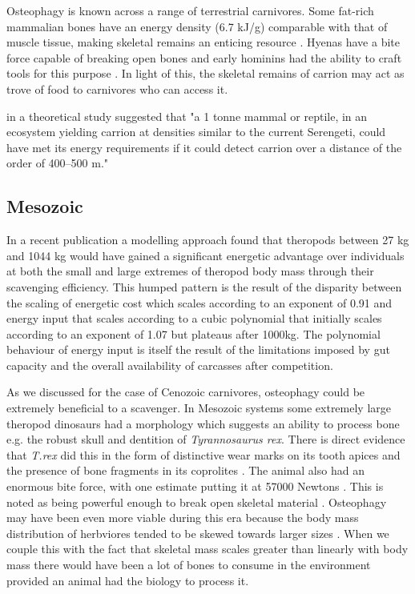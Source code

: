 \documentclass[a4paper,12pt]{article}
\begin{document}
Osteophagy is known across a range of terrestrial carnivores.
Some fat-rich mammalian bones have an energy density (6.7 kJ/g) comparable with that of muscle tissue, making skeletal remains an enticing resource \citep{brown1989study}. 
Hyenas have a bite force capable of breaking open bones and early hominins had the ability to craft tools for this purpose \citep{hone2010feeding,ARCM:ARCM12084}. 
In light of this, the skeletal remains of carrion may act as trove of food to carnivores who can access it.  

\cite{ruxton2004obligate} in a theoretical study suggested that "a 1 tonne mammal or reptile, in an ecosystem yielding carrion at densities similar to the current Serengeti, could have met its energy requirements if it could detect carrion over a distance of the order of 400–500 m."

\subsection*{Mesozoic}
In a recent publication a modelling approach found that theropods between 27 kg and 1044 kg would have gained a significant energetic advantage over individuals at both the small and large extremes of theropod body mass through their scavenging efficiency. 
This humped pattern is the result of the disparity between the scaling of energetic cost which scales according to an exponent of 0.91 and energy input that scales according to a cubic polynomial that initially scales according to an exponent of 1.07 but plateaus after 1000kg. 
The polynomial behaviour of energy input is itself the result of the limitations imposed by gut capacity and the overall availability of carcasses after competition.

As we discussed for the case of Cenozoic carnivores, osteophagy could be extremely beneficial to a scavenger. 
In Mesozoic systems some extremely large theropod dinosaurs had a morphology which suggests an ability to process bone e.g. the robust skull and dentition of \textit{Tyrannosaurus rex}. 
There is direct evidence that \textit{T.rex} did this in the form of distinctive wear marks on its tooth apices \citep{farlow1994wear,schubert2005wear} and the presence of bone fragments in its coprolites \citep{chin1998king}. 
The animal also had an enormous bite force, with one estimate putting it at 57000 Newtons \citep{bates2012estimating}. 
This is noted as being powerful enough to break open skeletal material \citep{rayfield2001cranial}. 
Osteophagy may have been even more viable during this era because the body mass distribution of herbviores tended to be skewed towards larger sizes \citep{10.1371/journal.pone.0051925}. 
When we couple this with the fact that skeletal mass scales greater than linearly with body mass \citep{prange1979scaling} there would have been a lot of bones to consume in the environment provided an animal had the biology to process it. 
\end{document}
